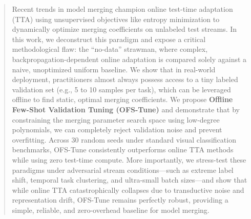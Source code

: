 \begin{abstract}
Recent trends in model merging champion online test-time adaptation (TTA) using unsupervised objectives like entropy minimization to dynamically optimize merging coefficients on unlabeled test streams. In this work, we deconstruct this paradigm and expose a critical methodological flaw: the ``no-data'' strawman, where complex, backpropagation-dependent online adaptation is compared solely against a naive, unoptimized uniform baseline. We show that in real-world deployment, practitioners almost always possess access to a tiny labeled validation set (e.g., 5 to 10 samples per task), which can be leveraged offline to find static, optimal merging coefficients. We propose \textbf{Offline Few-Shot Validation Tuning (OFS-Tune)} and demonstrate that by constraining the merging parameter search space using low-degree polynomials, we can completely reject validation noise and prevent overfitting. Across 30 random seeds under standard visual classification benchmarks, OFS-Tune consistently outperforms online TTA methods while using zero test-time compute. More importantly, we stress-test these paradigms under adversarial stream conditions---such as extreme label shift, temporal task clustering, and ultra-small batch sizes---and show that while online TTA catastrophically collapses due to transductive noise and representation drift, OFS-Tune remains perfectly robust, providing a simple, reliable, and zero-overhead baseline for model merging.
\end{abstract}
